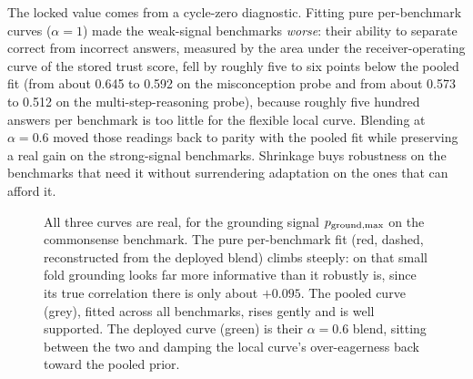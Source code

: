 \begin{bythenumbers}[Why $\alpha = 0.6$ was chosen]
The locked value comes from a cycle-zero diagnostic. Fitting pure per-benchmark
curves ($\alpha = 1$) made the weak-signal benchmarks \emph{worse}: their ability to
separate correct from incorrect answers, measured by the area under the
receiver-operating curve of the stored trust score, fell by roughly five to six
points below the pooled fit (from about 0.645 to 0.592 on the misconception probe and
from about 0.573 to 0.512 on the multi-step-reasoning probe), because roughly five
hundred answers per benchmark is too little for the flexible local curve. Blending at $\alpha = 0.6$ moved those readings back to parity with the pooled
fit while preserving a real gain on the strong-signal benchmarks. Shrinkage buys
robustness on the benchmarks that need it without surrendering adaptation on the ones
that can afford it.
\end{bythenumbers}

\begin{figure}[htbp]
\centering
{}
\caption[Shrinkage toward the pooled curve]{All three curves are real, for the
grounding signal $p_{\text{ground,max}}$ on the commonsense benchmark. The pure per-benchmark fit
(red, dashed, reconstructed from the deployed blend) climbs steeply: on that small
fold grounding looks far more informative than it robustly is, since its true
correlation there is only about $+0.095$. The pooled curve (grey), fitted across all
benchmarks, rises gently and is well supported. The deployed curve (green) is their
$\alpha=0.6$ blend, sitting between the two and damping the local curve's
over-eagerness back toward the pooled prior.}
\label{fig:shrinkage}
\end{figure}

